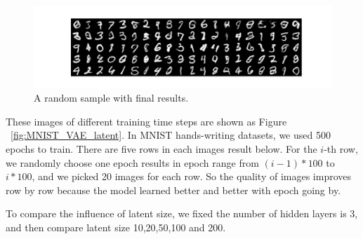 \documentclass[12pt,letterpaper]{article}
\begin{document}
\begin{figure}[h]
    \centering
    \includegraphics[width=.6\linewidth]{VAE_MNIST_0_20_256.png}
    \caption{\small A random sample with final results.}
    \label{fig:MNIST_VAE_latent_results}
\end{figure}

These images of different training time steps are shown as Figure ~\ref{fig:MNIST_VAE_latent}. In MNIST hands-writing datasets, we used 500 epochs to train. There are five rows in each images result below. For the $i$-th row, we randomly choose one epoch results in epoch range from $(i-1)*100$ to $i*100$, and we picked 20 images for each row. So the quality of images improves row by row because the model learned better and better with epoch going by. 

To compare the influence of latent size, we fixed the number of hidden layers is $3$, and then compare latent size 10,20,50,100 and 200.
\end{document}
